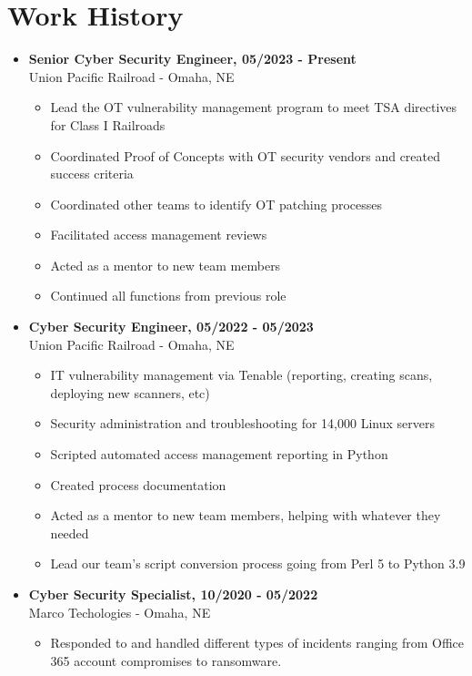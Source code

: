 \documentclass[a4paper,10pt]{article}
\begin{document}
\section*{Work History}
\begin{itemize}
    \item\textbf{Senior Cyber Security Engineer, 05/2023 - Present} \\
    Union Pacific Railroad - Omaha, NE
    \begin{itemize}
        \small
        \leftskip=4em
        \item Lead the OT vulnerability management program to meet TSA directives for Class I Railroads
        \item Coordinated Proof of Concepts with OT security vendors and created success criteria
        \item Coordinated other teams to identify OT patching processes
        \item Facilitated access management reviews
        \item Acted as a mentor to new team members
        \item Continued all functions from previous role
    \end{itemize}
    \item\textbf{Cyber Security Engineer, 05/2022 - 05/2023} \\
    Union Pacific Railroad - Omaha, NE
    \begin{itemize}
        \small
        \leftskip=4em
        \item IT vulnerability management via Tenable (reporting, creating scans, deploying new scanners, etc)
        \item Security administration and troubleshooting for 14,000 Linux servers
        \item Scripted automated access management reporting in Python
        \item Created process documentation
        \item Acted as a mentor to new team members, helping with whatever they needed
        \item Lead our team's script conversion process going from Perl 5 to Python 3.9
    \end{itemize}
    \item\textbf{Cyber Security Specialist, 10/2020 - 05/2022} \\
    Marco Techologies - Omaha, NE
    \begin{itemize}
        \small
        \leftskip=4em
        \item Responded to and handled different types of incidents ranging from Office 365 account compromises to ransomware.

\end{itemize}
\end{itemize}
\end{document}
